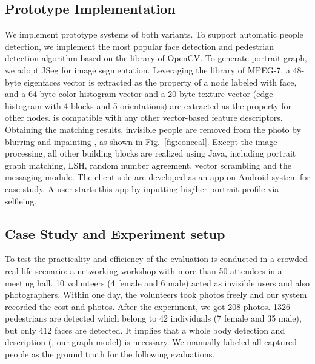 




\subsection{Prototype Implementation}
\vspace{-0.05in}
We implement prototype systems of both variants.
To support automatic people detection, we implement the most popular face detection \cite{viola2004robust}
 and pedestrian detection \cite{leibe2005pedestrian} algorithm based on the library of OpenCV.
To generate portrait graph,
we adopt JSeg \cite{deng2001unsupervised} for image segmentation.
Leveraging the library of MPEG-7,
a 48-byte eigenfaces vector\cite{turk1991eigenfaces} is extracted as the property of a node labeled with face,
 and a 64-byte color histogram vector and a 20-byte texture vector (edge histogram with 4 blocks and 5 orientations)
 are extracted as the property for other nodes.
\ourprotocol is compatible with any other vector-based feature descriptors.
Obtaining the matching results, invisible people are removed from the photo by blurring and inpainting \cite{criminisi2004region},
 as shown in Fig.~\ref{fig:conceal}.
Except the image processing,
 all other building blocks are realized using Java, including portrait graph matching,
 LSH, random number agreement, vector scrambling and the messaging module.
The client side are developed as an app on Android system for case study.
A user starts this app by inputting his/her portrait profile via selfieing.




\vspace{-0.05in}
\subsection{Case Study and Experiment setup}
\label{sec:case}
\vspace{-0.05in}




To test the practicality and efficiency of \ourprotocol
 the evaluation is conducted in a crowded real-life scenario:
 a networking workshop with more than 50 attendees in a  meeting hall.
10 volunteers (4 female and 6 male) acted as invisible users and also photographers.
Within one day, the volunteers took photos freely and our system recorded the cost and photos.
After the experiment, we got 208 photos.
1326 pedestrians are detected which belong to 42 individuals (7
 female and 35 male), but only 412 faces are detected.
It implies that
a whole body detection and description (\eg, our graph model) is necessary.
We manually labeled all captured people as the ground truth for the following evaluations.




